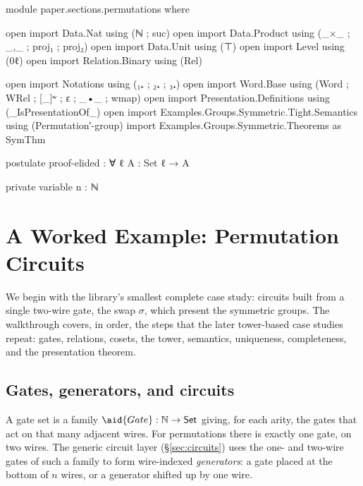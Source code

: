 \begin{code}[hide]
module paper.sections.permutations where

open import Data.Nat using (ℕ ; suc)
open import Data.Product using (_×_ ; _,_ ; proj₁ ; proj₂)
open import Data.Unit using (⊤)
open import Level using (0ℓ)
open import Relation.Binary using (Rel)

open import Notations using (₁₊ ; ₂₊ ; ₃₊)
open import Word.Base using (Word ; WRel ; [_]ʷ ; ε ; _•_ ; wmap)
open import Presentation.Definitions using (_IsPresentationOf_)
open import Examples.Groups.Symmetric.Tight.Semantics using (Permutation′-group)
import Examples.Groups.Symmetric.Theorems as SymThm

postulate
  proof-elided : ∀ {ℓ} {A : Set ℓ} → A

private variable
  n : ℕ
\end{code}
\section{A Worked Example: Permutation Circuits}\label{sec:permutations}

We begin with the library's smallest complete case study: circuits built
from a single two-wire gate, the swap $\sigma$, which present the symmetric
groups.  The walkthrough covers, in order, the steps that the later
tower-based case studies repeat: gates, relations, cosets, the tower,
semantics, uniqueness, completeness, and the presentation theorem.

\subsection{Gates, generators, and circuits}

A gate set is a family $\aid{Gate} : \mathbb{N} \to \mathsf{Set}$ giving,
for each arity, the gates that act on that many adjacent wires.  For
permutations there is exactly one gate, on two wires.  The generic circuit
layer (\S\ref{sec:circuits}) uses the one- and two-wire gates of such a
family to form wire-indexed \emph{generators}: a gate placed at the bottom of
$n$ wires, or a
generator shifted up by one wire.

